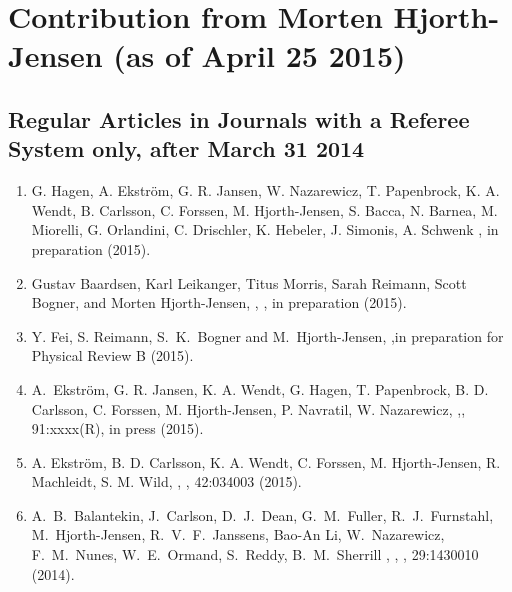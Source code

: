 \documentclass[prc,amsart,english,twocolumn,superscriptaddress,showpacs,floatfix]{revtex4}
\begin{document}
 \section*{Contribution from Morten Hjorth-Jensen (as of April 25 2015)}


 \subsection*{Regular Articles in Journals with a Referee System only, after March 31 2014}
 \begin{enumerate}


\item G. Hagen, A. Ekström, G. R. Jansen, W. Nazarewicz, T. Papenbrock, K. A. Wendt, B. Carlsson, C. Forssen, M. Hjorth-Jensen, S. Bacca, N. Barnea, M. Miorelli, G. Orlandini, C. Drischler, K. Hebeler, J. Simonis, A. Schwenk
, in preparation (2015).

\item Gustav Baardsen, Karl Leikanger, Titus Morris, Sarah Reimann, Scott Bogner, and Morten Hjorth-Jensen,
, 
, in preparation (2015).

\item Y. Fei, S. Reimann, S.~K.~Bogner and M.~Hjorth-Jensen, 
,\newblock in preparation for Physical Review B (2015).

\item A.~Ekstr\"om, G. R. Jansen, K. A. Wendt, G. Hagen, T. Papenbrock, B. D. Carlsson, C. Forssen, M. Hjorth-Jensen, P. Navratil, W. Nazarewicz, 
,, 91:xxxx(R), in press (2015).

\item A. Ekstr\"om, B. D. Carlsson, K. A. Wendt, C. Forssen, M. Hjorth-Jensen, R. Machleidt, S. M. Wild,
, 
, 42:034003 (2015).


\item A.~B.~Balantekin, J.~Carlson, D.~J.~Dean, G.~M.~Fuller, R.~J.~Furnstahl, M.~Hjorth-Jensen, R.~V.~F.~Janssens, Bao-An Li, W.~Nazarewicz, F.~M.~Nunes, W.~E.~Ormand, S.~Reddy, B.~M.~Sherrill
,
, 
, 29:1430010 (2014).


\end{enumerate}
\end{document}
